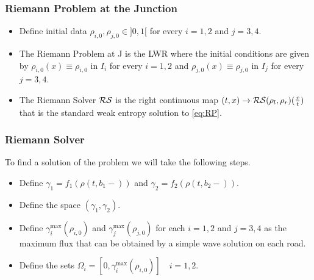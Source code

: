 \begin{frame}
	\frametitle{Riemann Problem at the Junction}
\begin{itemize}
	\item Define initial data $\rho_{i,0},\rho_{j,0} \in ]0,1[$ for every $i=1,2$ and $j=3,4$.
	\vspace*{5mm}
	\item The Riemann Problem at J is the LWR where the initial conditions are given by $\rho_{i,0}(x)\equiv \rho_{i,0} $ in $I_i$ for every $i=1,2$ and $\rho_{j,0}(x)\equiv \rho_{j,0} $ in $I_j$ for every $j=3,4$.
	\vspace*{5mm}
	\item The Riemann Solver $\mathcal{RS}$ is the right continuous map $(t,x)\rightarrow \mathcal{RS} (\rho_l , \rho_r)(\frac{x}{t})$ that is the standard weak entropy solution to \eqref{eq:RP}.
\end{itemize}
\end{frame}	


\begin{frame}[fragile]
	\frametitle{Riemann Solver}
To find a solution of the problem we will take the following steps.
\begin{itemize}
	\item Define $\gamma_1=f_1(\rho(t,b_1-))$ and $\gamma_2=f_2(\rho(t,b_2-))$.
	\item<1-> Define the space $(\gamma_1 ,\gamma_2).$
	\only<1-1> {\begin{figure}[ht]
\centering

\label{fig:spaceSet}
\end{figure}} 	
	\item<2-> Define $\gamma_i^{\max}(\rho_{i,0})$ and $\gamma_j^{\max}(\rho_{j,0})$ for each $i=1,2$ and $j=3,4$ as the maximum flux that can be obtained by a simple wave solution on each road.
	\only<2-2>{\vspace*{35mm}}
	\item<3-> Define the sets $\Omega_i=[0,\gamma_i^{\max}(\rho_{i,0})] \quad i=1,2.$
\end{itemize}	
\end{frame}	


